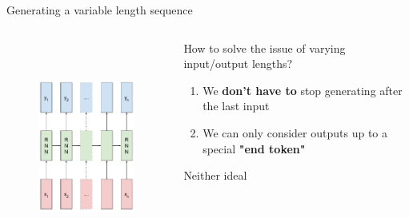 \documentclass[12pt,aspectratio=169,handout]{beamer}
\begin{document}
\begin{frame}{Generating a variable length sequence}
\vspace{-2em}
\begin{columns}[T] %
		\begin{column}{.48\textwidth}
			\begin{figure}[h]
				\includegraphics[height=7cm]{img/variable_input_output.pdf}
			\end{figure}
		\end{column}

		\begin{column}{.48\textwidth}
			\pause
			\vspace{1cm}
			How to solve the issue of varying input/output lengths?
			\pause
	
			\begin{enumerate}
				\item We \textbf{don't have to} stop generating after the last input
				\item We can only consider outputs up to a special \textbf{"end token"} 
			\end{enumerate}
			\pause
			Neither ideal

		\end{column}
\end{columns}
\end{frame}
\end{document}
